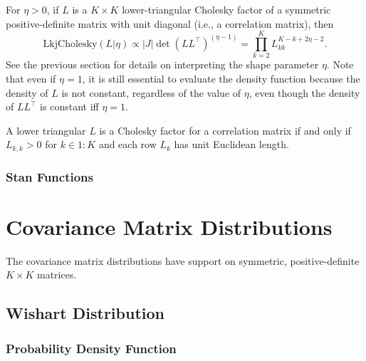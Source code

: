 \begin{description}
{\begin{description}
{For $\eta > 0$, if $L$ is a $K \times K$ lower-triangular Cholesky factor of a symmetric positive-definite matrix with unit diagonal (i.e., a correlation matrix), then \[ \text{LkjCholesky}(L|\eta) \propto \left|J\right|\det(L L^\top)^{(\eta - 1)} = \prod_{k=2}^K L_{kk}^{K-k+2\eta-2}. \] See the previous section for details on interpreting the shape parameter $\eta$. Note that even if $\eta=1$, it is still essential to evaluate the density function because the density of $L$ is not constant, regardless of the value of $\eta$, even though the density of $LL^\top$ is constant iff $\eta=1$.


A lower triangular $L$ is a Cholesky factor for a correlation matrix if and only if $L_{k,k} > 0$ for $k \in 1{:}K$ and each row $L_k$ has unit Euclidean length.




\subsection{Stan Functions}


\begin{description}    \end{description}


\begin{description}  \end{description}


\chapter{Covariance Matrix Distributions}


The covariance matrix distributions have support on symmetric, positive-definite $K \times K$ matrices.


\section{Wishart Distribution}


\subsection{Probability Density Function}


}
\end{description}}
\end{description}
